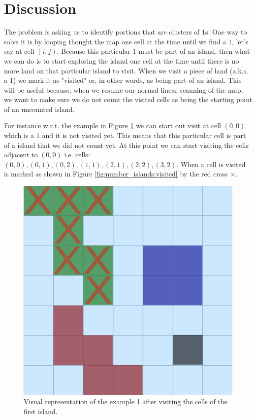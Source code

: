 \section{Discussion}
\label{number_islands:sec:discussion}
The problem is asking us to identify portions that are clusters of $1$s. One way to solve it is by looping thought the map one cell at the time until we find a $1$, let's say at cell $(i,j)$. Because this particular $1$ must be part of an island, then what we can do is to start exploring the island one cell at the time until there is no more land on that particular island to visit. When we visit a piece of land (a.k.a. a $1$) we mark it as "visited" or, in other words, as being part of an island. This will be useful because, when we resume our normal linear scanning of the map, we want to make sure we do not count the visited cells as being the starting point of an uncounted island.

For instance w.r.t. the example in Figure \ref{fig:number_islands:example1} we can start out visit at cell $(0,0)$ which is a  $1$ and it is not visited yet. This means that this particular cell is part of a island that we did not count yet. At this point we can start visiting the cells adjacent to $(0,0)$ i.e. cells: $(0,0), (0,1), (0,2), (1,1), (2,1), (2,2), (3,2)$. When a cell is visited is marked as shown in Figure  \ref{fig:number_islands:visited} by the red cross \textcolor[HTML]{860000}{$\times$}.

\begin{figure}
	\centering
	\includegraphics[scale=0.4]{sources/number_islands/images/visited}
	\caption{Visual representation of the example 1 after visiting the cells of the first island.}
	\label{fig:number_islands:example1}
\end{figure}

